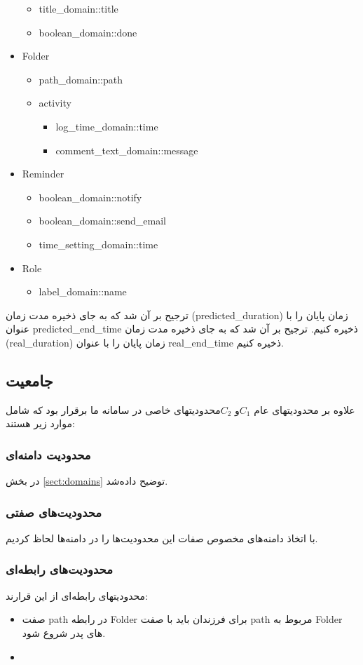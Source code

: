 \documentclass{article}
\begin{document}
\begin{itemize}
	\begin{itemize}
	\item title\_domain::title
	\item boolean\_domain::done
	\end{itemize}
	
\item Folder
	\begin{itemize}
	\item path\_domain::path
	\item activity	
		\begin{itemize}
		\item log\_time\_domain::time
		\item comment\_text\_domain::message
		\end{itemize}
	\end{itemize}
\item Reminder
	\begin{itemize}
	\item boolean\_domain::notify
	\item boolean\_domain::send\_email
	\item time\_setting\_domain::time
	\end{itemize}
\item Role
	\begin{itemize}
	\item label\_domain::name
	\end{itemize}
\end{itemize}
\persian
ترجیح بر آن شد که به جای ذخیره مدت زمان (predicted\_duration) زمان پایان را با عنوان predicted\_end\_time ذخیره کنیم. 
ترجیح بر آن شد که به جای ذخیره مدت زمان (real\_duration) زمان پایان را با عنوان real\_end\_time ذخیره کنیم. 
\subsection*{جامعیت}
علاوه بر محدودیتهای عام $C_1 $و $ C_2$محدودیتهای خاصی در سامانه ما برقرار بود که شامل موارد زیر هستند:
\subsubsection*{محدودیت دامنه‌ای}
در بخش 
\ref{sect:domains}
توضیح داده‌شد.
\subsubsection*{محدودیت‌های صفتی}
با اتخاذ دامنه‌های مخصوص صفات این محدودیت‌ها را در دامنه‌ها لحاظ کردیم.
\subsubsection*{محدودیت‌های رابطه‌ای}
محدودیتهای رابطه‌ای از این قرارند:
\begin{itemize}
\item
صفت path در رابطه Folder برای فرزندان باید با صفت path مربوط به Folder های پدر شروع شود. 
\item

\end{itemize}
\end{document}
